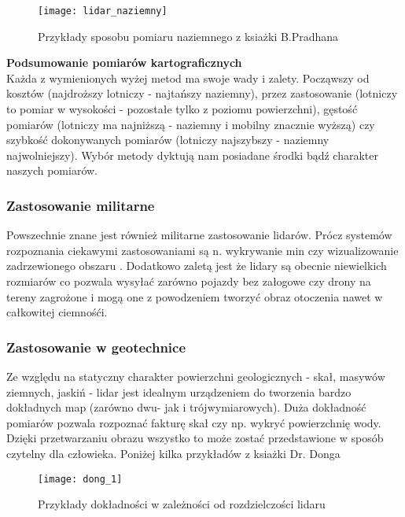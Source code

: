 \begin{figure}[h]
    \centering
    \texttt{[image: lidar\_naziemny]}
    \caption{Przykłady sposobu pomiaru naziemnego z ksiażki B.Pradhana \cite{pradhan}}
    \label{fig:lidar_naziemny}
\end{figure}

\textbf{Podsumowanie pomiarów kartograficznych}\\
Każda z wymienionych wyżej metod ma swoje wady i zalety. Począwszy od kosztów (najdroższy lotniczy - najtańszy naziemny), przez zastosowanie (lotniczy to pomiar w wysokości - pozostałe tylko z poziomu powierzchni), gęstość pomiarów (lotniczy ma najniższą - naziemny i mobilny znacznie wyższą) czy szybkość dokonywanych pomiarów (lotniczy najszybszy - naziemny najwolniejszy). Wybór metody dyktują nam posiadane środki bądź charakter naszych pomiarów.

\newpage
\subsubsection{Zastosowanie militarne}
Powszechnie znane jest również militarne zastosowanie lidarów. Prócz systemów rozpoznania ciekawymi zastosowaniami są n. wykrywanie min czy wizualizowanie zadrzewionego obszaru \cite{military}. Dodatkowo zaletą jest że lidary są obecnie niewielkich rozmiarów co pozwala wysyłać zarówno pojazdy bez załogowe czy drony  na tereny zagrożone i mogą one z powodzeniem tworzyć obraz otoczenia nawet w całkowitej ciemnośći.\\

\subsubsection{Zastosowanie w geotechnice}
Ze względu na statyczny charakter powierzchni geologicznych - skał, masywów ziemnych, jaskiń - lidar jest idealnym urządzeniem do tworzenia bardzo dokładnych map (zarówno dwu- jak i trójwymiarowych). Duża dokładność pomiarów pozwala rozpoznać fakturę skał czy np. wykryć powierzchnię wody. Dzięki przetwarzaniu obrazu wszystko to może zostać przedstawione w sposób czytelny dla człowieka. Poniżej kilka przykładów z ksiażki Dr. Donga \cite{dong}\\

\begin{figure}[h]
    \centering
    \texttt{[image: dong\_1]}
    \caption{Przykłady dokładności w zależności od rozdzielczości lidaru \cite{dong}}
    \label{fig:dong_1}
\end{figure}

